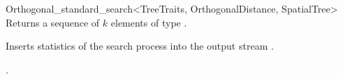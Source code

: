 \begin{ccRefClass}{Orthogonal_standard_search<TreeTraits, OrthogonalDistance, SpatialTree>}
{Returns a sequence of $k$ elements of type }.


\begin{ccAdvanced}
{
Inserts statistics of the search process into the output stream .
}
\end{ccAdvanced}

\ccSeeAlso

.

\end{ccRefClass}


